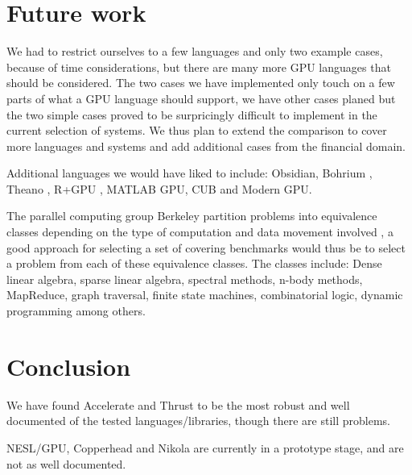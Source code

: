 \documentclass[preprint]{sigplanconf}
\begin{document}
\section{Future work}
We had to restrict ourselves to a few languages and only two example
cases, because of time considerations, but there are many more GPU
languages that should be considered. The two cases we have implemented
only touch on a few parts of what a GPU language should support, we
have other cases planed but the two simple cases proved to be
surpricingly difficult to implement in the current selection of
systems. We thus plan to extend the comparison to cover more languages
and systems and add additional cases from the financial domain.

Additional languages we would have liked to include: Obsidian, Bohrium
\cite{homepage:bohrium}, Theano \cite{bergstra2010theano}, R+GPU
\cite{homepage:rgpu}, MATLAB GPU, CUB and Modern GPU.

The parallel computing group Berkeley partition problems into
equivalence classes depending on the type of computation and data
movement involved \cite{homepage:dwarfmine}, a good approach for
selecting a set of covering benchmarks would thus be to select a
problem from each of these equivalence classes. The classes include:
Dense linear algebra, sparse linear algebra, spectral methods, n-body
methods, MapReduce, graph traversal, finite state machines,
combinatorial logic, dynamic programming among others.


\section{Conclusion}
We have found Accelerate and Thrust to be the most robust and well
documented of the tested languages/libraries, though there are still
problems.

NESL/GPU, Copperhead and Nikola are currently in a prototype stage,
and are not as well documented.
\end{document}
